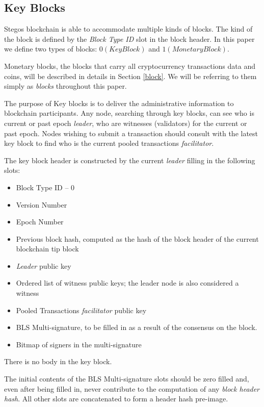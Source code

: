 \documentclass[a4paper, 10pt, conference]{ieeeconf}
\begin{document}
\subsection{Key Blocks}

Stegos blockchain is able to accommodate multiple kinds of blocks. The kind of the block is defined by the \textit{Block Type ID} slot in the block header. In this paper we define two types of blocks: $0 (KeyBlock)$ and $1 (MonetaryBlock)$.

Monetary blocks, the blocks that carry all cryptocurrency transactions data and coins, will be described in details in Section \ref{block}. We will be referring to them simply as \textit{blocks} throughout this paper. 

The purpose of Key blocks is to deliver the administrative information to blockchain participants. Any node, searching through key blocks, can see who is current or past epoch \textit{leader}, who are witnesses (validators) for the current or past epoch. Nodes wishing to submit a transaction should consult with the latest key block to find who is the current pooled transactions \textit{facilitator}.

The key block header is constructed by the current \textit{leader} filling in the following slots:

\begin{itemize}
	\item {Block Type ID -- 0}
	\item {Version Number}
	\item {Epoch Number}
	\item {Previous block hash, computed as the hash of the block header of the current blockchain tip block}
	\item {\textit{Leader} public key}
	\item {Ordered list of witness public keys; the leader node is also considered a witness}
	\item {Pooled Transactions \textit{facilitator} public key}
	\item {BLS Multi-signature, to be filled in as a result of the consensus on the block.}
	\item {Bitmap of signers in the multi-signature}
\end{itemize}

There is no body in the key block.

The initial contents of the BLS Multi-signature slots should be zero filled and, even after being filled in, never contribute to the computation of any \textit{block header hash}. All other slots are concatenated to form a header hash pre-image.
\end{document}
